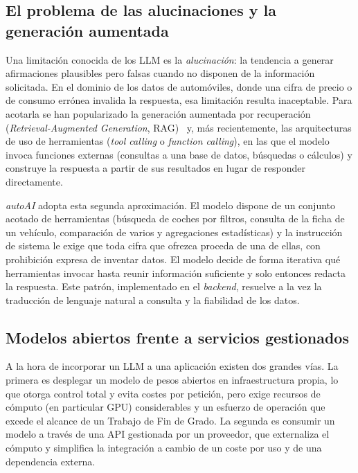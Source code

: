 \subsection{El problema de las alucinaciones y la generación aumentada}

Una limitación conocida de los LLM es la \emph{alucinación}: la tendencia a
generar afirmaciones plausibles pero falsas cuando no disponen de la información
solicitada. En el dominio de los datos de automóviles, donde una cifra de precio o
de consumo errónea invalida la respuesta, esa limitación resulta inaceptable. Para
acotarla se han popularizado la generación aumentada por recuperación
(\emph{Retrieval-Augmented Generation}, RAG)~\cite{lewis2020rag} y, más recientemente, las
arquitecturas de uso de herramientas (\emph{tool calling} o \emph{function
calling}), en las que el modelo invoca funciones externas (consultas a una base de
datos, búsquedas o cálculos) y construye la respuesta a partir de sus resultados
en lugar de responder directamente.

\emph{autoAI} adopta esta segunda aproximación. El modelo dispone de un conjunto
acotado de herramientas (búsqueda de coches por filtros, consulta de la ficha de
un vehículo, comparación de varios y agregaciones estadísticas) y la instrucción
de sistema le exige que toda cifra que ofrezca proceda de una de ellas, con
prohibición expresa de inventar datos. El modelo decide de forma iterativa qué
herramientas invocar hasta reunir información suficiente y solo entonces redacta la
respuesta. Este patrón, implementado en el \emph{backend}, resuelve a la vez la
traducción de lenguaje natural a consulta y la fiabilidad de los datos.

\subsection{Modelos abiertos frente a servicios gestionados}

A la hora de incorporar un LLM a una aplicación existen dos grandes vías. La
primera es desplegar un modelo de pesos abiertos en infraestructura propia, lo que
otorga control total y evita costes por petición, pero exige recursos de cómputo
(en particular GPU) considerables y un esfuerzo de operación que excede el alcance
de un Trabajo de Fin de Grado. La segunda es consumir un modelo a través de una
API gestionada por un proveedor, que externaliza el cómputo y simplifica la
integración a cambio de un coste por uso y de una dependencia externa.

